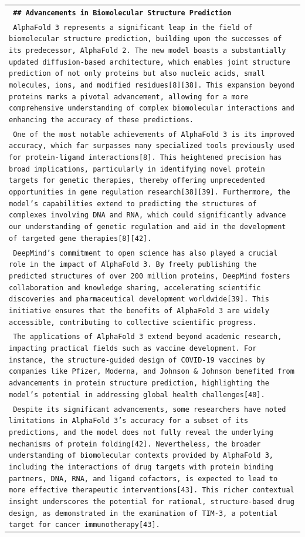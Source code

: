 \documentclass[11pt]{article}
\begin{document}
\begin{longtable}{p{\textwidth}}
\vspace{1pt}
\texttt{\small{\textbf{ \#\# Advancements in Biomolecular Structure Prediction }}} \\
\texttt{\small{ AlphaFold 3 represents a significant leap in the field of biomolecular structure prediction, building upon the successes of its predecessor, AlphaFold 2. The new model boasts a substantially updated diffusion-based architecture, which enables joint structure prediction of not only proteins but also nucleic acids, small molecules, ions, and modified residues[8][38]. This expansion beyond proteins marks a pivotal advancement, allowing for a more comprehensive understanding of complex biomolecular interactions and enhancing the accuracy of these predictions. }} \\
\texttt{\small{ One of the most notable achievements of AlphaFold 3 is its improved accuracy, which far surpasses many specialized tools previously used for protein-ligand interactions[8]. This heightened precision has broad implications, particularly in identifying novel protein targets for genetic therapies, thereby offering unprecedented opportunities in gene regulation research[38][39]. Furthermore, the model's capabilities extend to predicting the structures of complexes involving DNA and RNA, which could significantly advance our understanding of genetic regulation and aid in the development of targeted gene therapies[8][42]. }} \\
\texttt{\small{ DeepMind's commitment to open science has also played a crucial role in the impact of AlphaFold 3. By freely publishing the predicted structures of over 200 million proteins, DeepMind fosters collaboration and knowledge sharing, accelerating scientific discoveries and pharmaceutical development worldwide[39]. This initiative ensures that the benefits of AlphaFold 3 are widely accessible, contributing to collective scientific progress. }} \\
\texttt{\small{ The applications of AlphaFold 3 extend beyond academic research, impacting practical fields such as vaccine development. For instance, the structure-guided design of COVID-19 vaccines by companies like Pfizer, Moderna, and Johnson \& Johnson benefited from advancements in protein structure prediction, highlighting the model's potential in addressing global health challenges[40]. }} \\
\texttt{\small{ Despite its significant advancements, some researchers have noted limitations in AlphaFold 3's accuracy for a subset of its predictions, and the model does not fully reveal the underlying mechanisms of protein folding[42]. Nevertheless, the broader understanding of biomolecular contexts provided by AlphaFold 3, including the interactions of drug targets with protein binding partners, DNA, RNA, and ligand cofactors, is expected to lead to more effective therapeutic interventions[43]. This richer contextual insight underscores the potential for rational, structure-based drug design, as demonstrated in the examination of TIM-3, a potential target for cancer immunotherapy[43]. }} \\

\end{longtable}
\end{document}
